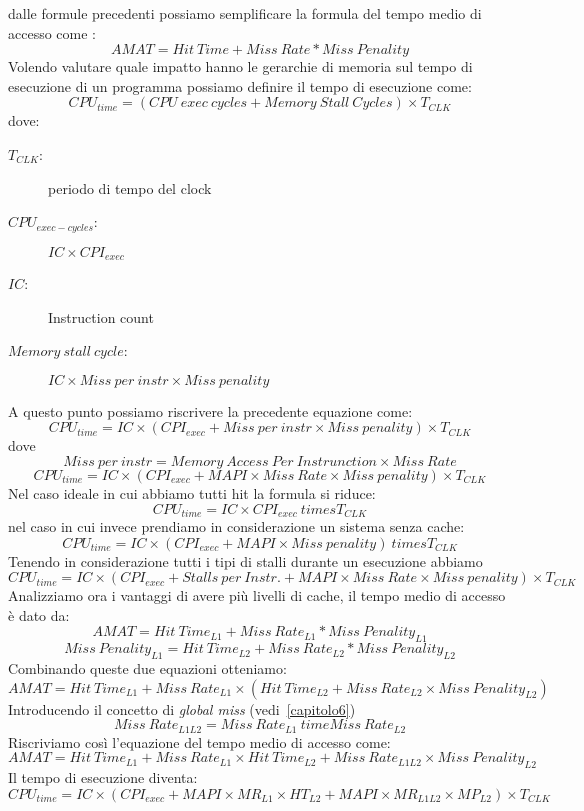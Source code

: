 dalle formule precedenti possiamo semplificare la formula del tempo medio di accesso come :
$$AMAT = Hit \ Time + Miss \ Rate * Miss \ Penality$$
Volendo valutare quale impatto hanno le gerarchie di memoria sul tempo di esecuzione di un programma possiamo definire il tempo di esecuzione come:
$$CPU_{time} = (CPU \ exec \ cycles+ Memory \ Stall \ Cycles) \times T_{CLK}$$
dove:
\begin{description}
\item[$T_{CLK}$:] periodo di tempo del clock
\item[$CPU_{exec-cycles}$:] $IC \times CPI_{exec}$
\item[$IC$:] Instruction count
\item[$Memory \ stall \ cycle$:] $IC \times Miss \ per \ instr \times Miss \ penality$
\end{description}
A questo punto possiamo riscrivere la precedente equazione come:
$$CPU_{time} = IC \times (CPI_{exec} + Miss \ per \ instr \times Miss \ penality) \times T_{CLK}$$
dove 
$$Miss \ per \ instr = Memory \ Access \ Per \ Instrunction \times Miss \ Rate$$
$$CPU_{time} = IC \times (CPI_{exec} + MAPI \times Miss \ Rate \times Miss \ penality) \times T_{CLK}$$
Nel caso ideale in cui abbiamo tutti hit la formula si riduce:
$$CPU_{time} = IC \times CPI_{exec} \ times T_{CLK}$$
nel caso in cui invece prendiamo in considerazione un sistema senza cache:
$$CPU_{time} = IC \times (CPI_{exec} + MAPI \times Miss \ penality) \ times T_{CLK}$$
Tenendo in considerazione tutti i tipi di stalli durante un esecuzione abbiamo 
$$CPU_{time} = IC \times (CPI_{exec} + Stalls \ per \ Instr. + MAPI \times Miss \ Rate \times Miss \ penality) \times T_{CLK}$$
Analizziamo ora i vantaggi di avere più livelli di cache, il tempo medio di accesso è dato da:
$$AMAT = Hit \ Time_{L1} + Miss \ Rate_{L1} * Miss \ Penality_{L1}$$
$$Miss \ Penality_{L1} = Hit \ Time_{L2} + Miss \ Rate_{L2} * Miss \ Penality_{L2}$$
Combinando queste due equazioni otteniamo:
$$AMAT = Hit \ Time_{L1} + Miss \ Rate_{L1} \times (Hit \ Time_{L2} + Miss \ Rate_{L2} \times Miss \ Penality_{L2})$$
Introducendo il concetto di \emph{global miss} (vedi \chaptername\,\ref{capitolo6})
$$Miss \ Rate _{L1L2} = Miss \ Rate_{L1} \ time Miss \ Rate_{L2}$$
Riscriviamo così l'equazione del tempo medio di accesso come: 
$$AMAT = Hit \ Time_{L1} + Miss \ Rate_{L1} \times Hit \ Time_{L2} + Miss \ Rate_{L1L2} \times Miss \ Penality_{L2}$$
Il tempo di esecuzione diventa:
$$CPU_{time} = IC \times (CPI_{exec} + MAPI \times MR_{L1} \times HT_{L2}+ MAPI \times MR_{L1L2} \times MP_{L2}) \times T_{CLK}$$